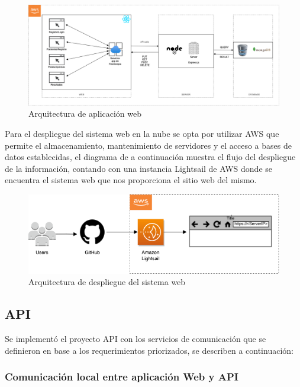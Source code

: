 \documentclass[12pt]{article}
\begin{document}
\begin{figure}[ht]
\centering
\includegraphics[scale=0.4]{imag/ArquAWS.png}
\caption{Arquitectura de aplicación web }
\label{6}
\end{figure}
\FloatBarrier

Para el despliegue del sistema web en la nube se opta por utilizar AWS que permite el almacenamiento, mantenimiento de servidores y el acceso a bases de datos establecidas, el diagrama de a continuación muestra el flujo del despliegue de la información, contando con una instancia Lightsail de AWS donde se encuentra el sistema web que nos proporciona el sitio web del mismo.

\begin{figure}[ht]
\centering
\includegraphics[scale=0.45]{imag/Lightsail.png}
\caption{Arquitectura de despliegue del sistema web }
\label{6}
\end{figure}
\FloatBarrier






\subsection{API}

Se implementó el proyecto API con los servicios de comunicación que se definieron en base a los requerimientos priorizados, se describen a continuación: 


\subsubsection{Comunicación local entre aplicación Web y API}
\end{document}
